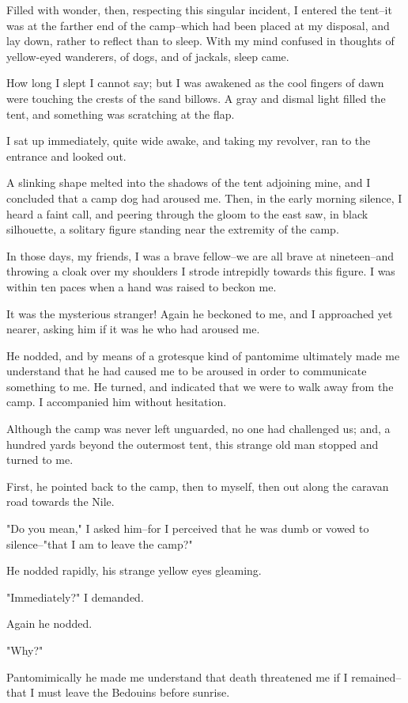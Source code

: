 Filled with wonder, then, respecting this singular incident, I entered
the tent--it was at the farther end of the camp--which had been placed
at my disposal, and lay down, rather to reflect than to sleep. With my
mind confused in thoughts of yellow-eyed wanderers, of dogs, and of
jackals, sleep came.

How long I slept I cannot say; but I was awakened as the cool fingers
of dawn were touching the crests of the sand billows. A gray and
dismal light filled the tent, and something was scratching at the
flap.

I sat up immediately, quite wide awake, and taking my revolver, ran
to the entrance and looked out.

A slinking shape melted into the shadows of the tent adjoining mine,
and I concluded that a camp dog had aroused me. Then, in the early
morning silence, I heard a faint call, and peering through the gloom
to the east saw, in black silhouette, a solitary figure standing near
the extremity of the camp.

In those days, my friends, I was a brave fellow--we are all brave at
nineteen--and throwing a cloak over my shoulders I strode intrepidly
towards this figure. I was within ten paces when a hand was raised to
beckon me.

It was the mysterious stranger! Again he beckoned to me, and I
approached yet nearer, asking him if it was he who had aroused me.

He nodded, and by means of a grotesque kind of pantomime ultimately
made me understand that he had caused me to be aroused in order to
communicate something to me. He turned, and indicated that we were to
walk away from the camp. I accompanied him without hesitation.

Although the camp was never left unguarded, no one had challenged us;
and, a hundred yards beyond the outermost tent, this strange old man
stopped and turned to me.

First, he pointed back to the camp, then to myself, then out along
the caravan road towards the Nile.

"Do you mean," I asked him--for I perceived that he was dumb or vowed
to silence--"that I am to leave the camp?"

He nodded rapidly, his strange yellow eyes gleaming.

"Immediately?" I demanded.

Again he nodded.

"Why?"

Pantomimically he made me understand that death threatened me if I
remained--that I must leave the Bedouins before sunrise.

